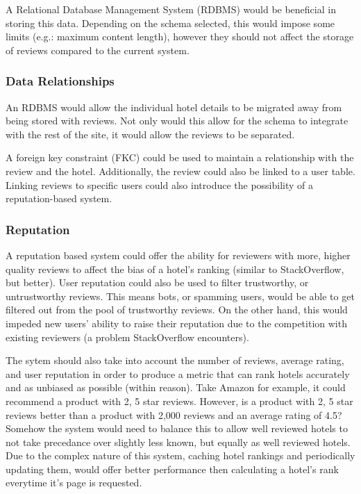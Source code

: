 \documentclass[a4paper]{article}
\begin{document}
A Relational Database Management System (RDBMS) would be beneficial in storing this data.
Depending on the schema selected, this would impose some limits (e.g.: maximum content length), however they should not affect the storage of reviews compared to the current system.

\subsubsection{Data Relationships}
An RDBMS would allow the individual hotel details to be migrated away from being stored with reviews.
Not only would this allow for the schema to integrate with the rest of the site, it would allow the reviews to be separated.

A foreign key constraint (FKC) could be used to maintain a relationship with the review and the hotel.
Additionally, the review could also be linked to a user table.
Linking reviews to specific users could also introduce the possibility of a reputation-based system.

\subsubsection{Reputation}
A reputation based system could offer the ability for reviewers with more, higher quality reviews to affect the bias of a hotel's ranking (similar to StackOverflow, but better).
User reputation could also be used to filter trustworthy, or untrustworthy reviews.
This means bots, or spamming users, would be able to get filtered out from the pool of trustworthy reviews.
On the other hand, this would impeded new users' ability to raise their reputation due to the competition with existing reviewers (a problem StackOverflow encounters).

The sytem should also take into account the number of reviews, average rating, and user reputation in order to produce a metric that can rank hotels accurately and as unbiased as possible (within reason).
Take Amazon for example, it could recommend a product with 2, 5 star reviews.
However, is a product with 2, 5 star reviews better than a product with 2,000 reviews and an average rating of 4.5?
Somehow the system would need to balance this to allow well reviewed hotels to not take precedance over slightly less known, but equally as well reviewed hotels.
Due to the complex nature of this system, caching hotel rankings and periodically updating them, would offer better performance then calculating a hotel's rank everytime it's page is requested.
\end{document}
